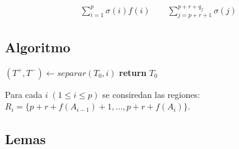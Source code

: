 \documentclass[12pt, letterpaper, twoside]{article}
\begin{document}
        \begin{equation*}
            \begin{aligned}
                \sum_{i=1}^{p}\sigma(i)f(i) \qquad \sum_{j=p+r+1}^{p+r+q_f}\sigma(j)
            \end{aligned}
        \end{equation*}

    \subsection{Algoritmo}
    \begin{algorithm}
        \begin{algorithmic}[1]
                \State $(T^+, T^-) \leftarrow separar(T_{0}, i)$
                \EndFor
            \EndFor
            \State \textbf{return} $T_0$
            \EndProcedure
        \end{algorithmic}
    \end{algorithm}

    Para cada $i\;(1\leq i \leq p)$ se consiredan las regiones: $R_i=\{p+r+f(A_{i-1})+1,\dots,p+r+f(A_i)\}$.

    \subsection{Lemas}
\end{document}
